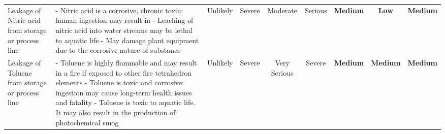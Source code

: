 \begin{table}
\begin{adjustbox}{max width=\linewidth}
\begin{tabularx}{\linewidth}{|p{3cm}|p{8cm}|c|c|c|c|c|c|c|}
Leakage of Nitric  acid from storage  or process line                        & - Nitric acid is a corrosive, chronic toxin: human ingestion may result in - Leaching of nitric acid into water streams may  be lethal to aquatic life - May damage plant equipment due to the corrosive  nature of substance                                                                                                                & Unlikely                              & Severe                                                        & Moderate                                                        & Serious                                                               & \cellcolor[HTML]{FCFF2F}\textbf{Medium}                       & \cellcolor[HTML]{34FF34}\textbf{Low}                            & \cellcolor[HTML]{FCFF2F}\textbf{Medium}                                 \\
Leakage of Toluene  from storage  or process line                            & - Toluene is highly flammable and may result in a     fire if exposed to other fire tetrahedron elements - Toluene is toxic and corrosive: ingestion may     cause long-term health issues and fatality   - Toluene is toxic to aquatic life. It may also result  in  the production of photochemical smog                                   & Unlikely                              & Severe                                                        & Very  Serious         & Severe                                                                & \cellcolor[HTML]{FCFF2F}\textbf{Medium}                       & \cellcolor[HTML]{FCFF2F}\textbf{Medium}                         & \cellcolor[HTML]{FCFF2F}\textbf{Medium}                                 
\end{tabularx}
\end{adjustbox}
\end{table}


